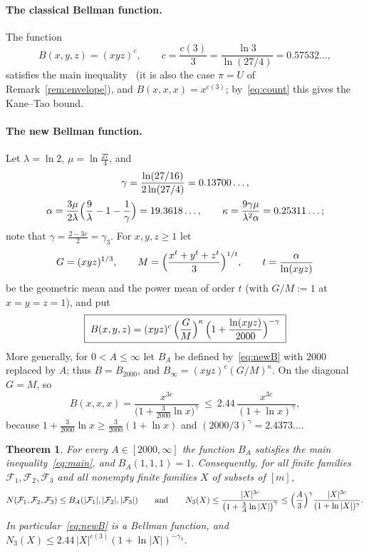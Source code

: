 \documentclass[11pt]{article}
\newtheorem{theorem}{Theorem}[section]
\theoremstyle{definition}
\numberwithin{equation}{section}
\newcommand{\Azero}{2000}
\newcommand{\cF}{\mathcal F}
\begin{document}
\paragraph{The classical Bellman function.}
The function
\begin{equation}\label{eq:classical}
B(x,y,z)=(xyz)^{c},\qquad c=\frac{c(3)}3=\frac{\ln3}{\ln(27/4)}=0.57532\ldots,
\end{equation}
satisfies the main inequality~\cite{KT17,Iva17} (it is also the case $\pi=U$ of Remark~\ref{rem:envelope}), and
$B(x,x,x)=x^{c(3)}$; by~\eqref{eq:count} this gives the Kane--Tao bound.

\paragraph{The new Bellman function.}
Let $\lambda=\ln2$, $\mu=\ln\frac{27}4$, and
\begin{equation}\label{eq:const}
\begin{gathered}
\gamma=\frac{\ln(27/16)}{2\ln(27/4)}=0.13700\ldots,\\[2pt]
\alpha=\frac{3\mu}{2\lambda}\Bigl(\frac9\lambda-1-\frac1\gamma\Bigr)=19.3618\ldots,\qquad
\kappa=\frac{9\gamma\mu}{\lambda^2\alpha}=0.25311\ldots;
\end{gathered}
\end{equation}
note that $\gamma=\frac{2-3c}2=\gamma_3$. For $x,y,z\ge1$ let
\[
G=(xyz)^{1/3},\qquad M=\Bigl(\frac{x^t+y^t+z^t}3\Bigr)^{1/t},\qquad t=\frac\alpha{\ln(xyz)}
\]
be the geometric mean and the power mean of order $t$ (with $G/M:=1$ at $x=y=z=1$), and put
\begin{equation}\label{eq:newB}
\boxed{\;B(x,y,z)=(xyz)^{c}\,\Bigl(\frac GM\Bigr)^{\kappa}\,\Bigl(1+\frac{\ln(xyz)}{2000}\Bigr)^{-\gamma}\;}
\end{equation}
More generally, for $0<A\le\infty$ let $B_A$ be defined by~\eqref{eq:newB} with $2000$ replaced by $A$; thus $B=B_{2000}$, and
$B_\infty=(xyz)^c(G/M)^\kappa$. On the diagonal $G=M$, so
\begin{equation}\label{eq:diag}
B(x,x,x)=\frac{x^{3c}}{\bigl(1+\frac3{2000}\ln x\bigr)^{\gamma}}\ \le\ 2.44\,\frac{x^{3c}}{(1+\ln x)^{\gamma}},
\end{equation}
because $1+\frac3{2000}\ln x\ge\frac3{2000}(1+\ln x)$ and $(2000/3)^\gamma=2.4373\ldots$.

\begin{theorem}\label{thm:main}
For every $A\in[\Azero,\infty]$ the function $B_A$ satisfies the main inequality~\eqref{eq:main}, and $B_A(1,1,1)=1$.
Consequently, for all finite families $\cF_1,\cF_2,\cF_3$ and all nonempty finite families $X$ of subsets of $[m]$,
\[
N(\cF_1,\cF_2,\cF_3)\le B_A(|\cF_1|,|\cF_2|,|\cF_3|)\qquad\text{and}\qquad
N_3(X)\le\frac{|X|^{3c}}{\bigl(1+\frac3A\ln|X|\bigr)^{\gamma}}\le\Bigl(\frac A3\Bigr)^{\gamma}\frac{|X|^{3c}}{(1+\ln|X|)^{\gamma}} .
\]
In particular~\eqref{eq:newB} is a Bellman function, and $N_3(X)\le2.44\,|X|^{c(3)}(1+\ln|X|)^{-\gamma_3}$.
\end{theorem}
\end{document}
